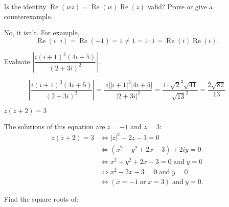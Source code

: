 \documentclass[answers, 12pt]{exam}
\renewcommand{\Re}{\operatorname{Re}}
\begin{document}
\begin{questions}
\question
Is the identity $\Re(wz)=\Re(w)\Re(z)$ valid? Prove or give a counterexample.
\begin{solution}
    No, it isn't. For example,
    \[
        \Re(i\cdot i) = \Re(-1) = 1 \neq 1 = 1\cdot 1 = \Re(i)\Re(i).
    \]
\end{solution}



\question
Evaluate $\left|\dfrac{i(i+1)^3(4i+5)}{(2+3i)^2}\right|$.
\begin{solution}
    \[
        \left|\dfrac{i(i+1)^3(4i+5)}{(2+3i)^2}\right| = \dfrac{|i||i+1|^3|4i+5|}{|2+3i|^2}
        =\frac{1\cdot \sqrt{2}^3\sqrt{41}}{\sqrt{13}^2} = \frac{2\sqrt{82}}{13}
    \]
\end{solution}



\question $z(\bar z+2)=3$
        \begin{solution}
            The solutions of this equation are $z=-1$ and $z=3$:
            \begin{align*}
                z(\bar z+2)=3&\Longleftrightarrow
                |z|^2 + 2z - 3 = 0\\
                &\Longleftrightarrow (x^2+y^2+2x-3) + 2iy = 0\\
                &\Longleftrightarrow x^2+y^2+2x-3=0\;\text{and}\;y=0\\
                &\Longleftrightarrow x^2-2x-3=0\;\text{and}\;y=0\\
                &\Longleftrightarrow (x=-1\;\text{or}\;x=3)\;\text{and}\;y=0.
            \end{align*}
        \end{solution}



\question\label{Q:sqrts} Find the square roots of:
\end{questions}
\end{document}
